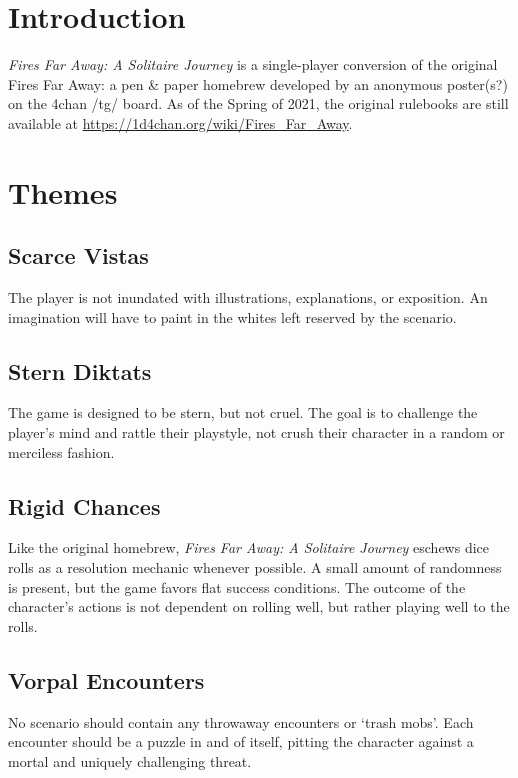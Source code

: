 \documentclass[12pt]{article}
\begin{document}
\begin{multicols*}{2}
\setlength\parindent{0pt}
\setcounter{page}{1}

{}
\section*{Introduction}
\emph{Fires Far Away: A Solitaire Journey} is a single-player conversion of the original Fires Far Away: a pen \& paper homebrew developed by an anonymous poster(s?) on the 4chan /tg/ board. As of the Spring of 2021, the original rulebooks are still available at \url{https://1d4chan.org/wiki/Fires_Far_Away}.

\section*{Themes}
\subsection*{Scarce Vistas}
The player is not inundated with illustrations, explanations, or exposition. An imagination will have to paint in the whites left reserved by the scenario.

\subsection*{Stern Diktats}
The game is designed to be stern, but not cruel. The goal is to challenge the player’s mind and rattle their playstyle, not crush their character in a random or merciless fashion.

\subsection*{Rigid Chances}
Like the original homebrew, \emph{Fires Far Away: A Solitaire Journey} eschews dice rolls as a resolution mechanic whenever possible. A small amount of randomness is present, but the game favors flat success conditions. The outcome of the character’s actions is not dependent on rolling well, but rather playing well to the rolls.

\subsection*{Vorpal Encounters}
No scenario should contain any throwaway encounters or ‘trash mobs’. Each encounter should be a puzzle in and of itself, pitting the character against a mortal and uniquely challenging threat.


\end{multicols*}
\end{document}
